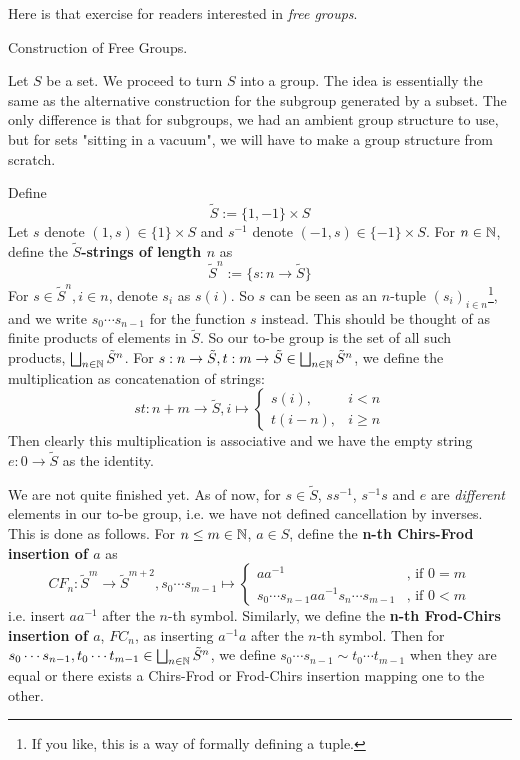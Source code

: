 \documentclass[../../book.tex]{subfiles}
\begin{document}
Here is that exercise for readers interested in \emph{free groups}. 

\begin{ex} \dolater Construction of Free Groups. 

    Let $S$ be a set. We proceed to turn $S$ into a group.
    The idea is essentially the same as the alternative 
    construction for the subgroup generated by a subset.
    The only difference is that for subgroups, 
    we had an ambient group structure to use,
    but for sets "sitting in a vacuum", 
    we will have to make a group structure from scratch.
    
    Define 
    \[\tilde{S} := \{1,-1\}\times S\]
    Let $s$ denote $(1,s) \in \{1\} \times S$ and
    $s^{-1}$ denote $(-1,s) \in \{-1\} \times S$. 
    For $n \in \mathbb{N}$, define the \textbf{$\tilde{S}$-strings of length $n$} as
    \[
        \tilde{S}^n := \{ s : n \to \tilde{S} \}
    \]
    For $s \in \tilde{S}^n, i \in n$, denote $s_i$ as $s(i)$.
    So $s$ can be seen as an $n$-tuple $(s_i)_{i \in n}$\footnote{If you like,
    this is a way of formally
    defining a tuple.},
    and we write $s_0\cdots s_{n-1}$ for the function $s$ instead.
    This should be thought of as finite products of elements in $\tilde{S}$.
    So our to-be group is the set of all such products, 
    $\bigsqcup_{n \in \mathbb{N}} \tilde{S}^n$.
    For 
    $s : n \to \tilde{S}, t : m \to \tilde{S} \in \bigsqcup_{n \in \mathbb{N}} \tilde{S}^n$,
    we define the multiplication as concatenation of strings: 
    \[
        st : n+m \to \tilde{S}, i \mapsto 
        \begin{cases}
            s(i), & i < n \\
            t(i-n), & i \geq n
        \end{cases}
    \]
    Then clearly this multiplication is associative and 
    we have the empty string $e : 0 \to \tilde{S}$ as the identity. 
    
    We are not quite finished yet.
    As of now, for $s \in \tilde{S}$, 
    $ss^{-1}$, $s^{-1}s$ and $e$ are \emph{different} elements in our to-be group,
    i.e. we have not defined cancellation by inverses. 
    This is done as follows. 
    For $n \leq m \in \mathbb{N}$, $a \in S$,  
    define the \textbf{n-th Chirs-Frod insertion of $a$}
    as 
    \[
        CF_n : \tilde{S}^m \to \tilde{S}^{m+2}, 
        s_0\cdots s_{m-1} \mapsto 
        \begin{cases}
        aa^{-1} & \text{, if } 0 = m\\
        s_0 \cdots s_{n-1} a a^{-1} s_n \cdots s_{m-1} & \text{, if } 0 < m
        \end{cases}
    \]
    i.e. insert $aa^{-1}$ after the $n$-th symbol. 
    Similarly, we define the \textbf{n-th Frod-Chirs insertion of $a$}, $FC_n$, 
    as inserting $a^{-1}a$ after the $n$-th symbol. 
    Then for 
    $s_0\cdots s_{n-1}, t_0\cdots t_{m-1} \in \bigsqcup_{n \in \mathbb{N}} \tilde{S}^n$, 
    we define $s_0\cdots s_{n-1} \sim t_0\cdots t_{m-1}$ when
    they are equal or there exists a Chirs-Frod or Frod-Chirs insertion
    mapping one to the other. 
    

\end{ex}
\end{document}
